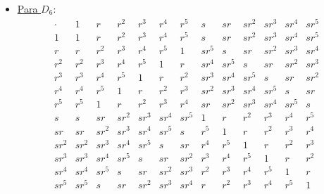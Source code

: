 \begin{ejercicio}
\begin{itemize}
        \item \ul{Para $D_6$}:
        \begin{equation*}
            \begin{array}{c|cccccccccccc}
                \cdot & 1 & r & r^2 & r^3 & r^4 & r^5 & s & sr & sr^2 & sr^3 & sr^4 & sr^5 \\ \hline
                1 & 1 & r & r^2 & r^3 & r^4 & r^5 & s & sr & sr^2 & sr^3 & sr^4 & sr^5 \\
                r & r & r^2 & r^3 & r^4 & r^5 & 1 & sr^5 & s & sr & sr^2 & sr^3 & sr^4 \\
                r^2 & r^2 & r^3 & r^4 & r^5 & 1 & r & sr^4 & sr^5 & s & sr & sr^2 & sr^3 \\
                r^3 & r^3 & r^4 & r^5 & 1 & r & r^2 & sr^3 & sr^4 & sr^5 & s & sr & sr^2 \\
                r^4 & r^4 & r^5 & 1 & r & r^2 & r^3 & sr^2 & sr^3 & sr^4 & sr^5 & s & sr \\
                r^5 & r^5 & 1 & r & r^2 & r^3 & r^4 & sr & sr^2 & sr^3 & sr^4 & sr^5 & s \\
                s & s & sr & sr^2 & sr^3 & sr^4 & sr^5 & 1 & r & r^2 & r^3 & r^4 & r^5 \\
                sr & sr & sr^2 & sr^3 & sr^4 & sr^5 & s & r^5 & 1 & r & r^2 & r^3 & r^4 \\
                sr^2 & sr^2 & sr^3 & sr^4 & sr^5 & s & sr & r^4 & r^5 & 1 & r & r^2 & r^3 \\
                sr^3 & sr^3 & sr^4 & sr^5 & s & sr & sr^2 & r^3 & r^4 & r^5 & 1 & r & r^2 \\
                sr^4 & sr^4 & sr^5 & s & sr & sr^2 & sr^3 & r^2 & r^3 & r^4 & r^5 & 1 & r \\
                sr^5 & sr^5 & s & sr & sr^2 & sr^3 & sr^4 & r & r^2 & r^3 & r^4 & r^5 & 1
            \end{array}
        \end{equation*}

    \end{itemize}
\end{ejercicio}

